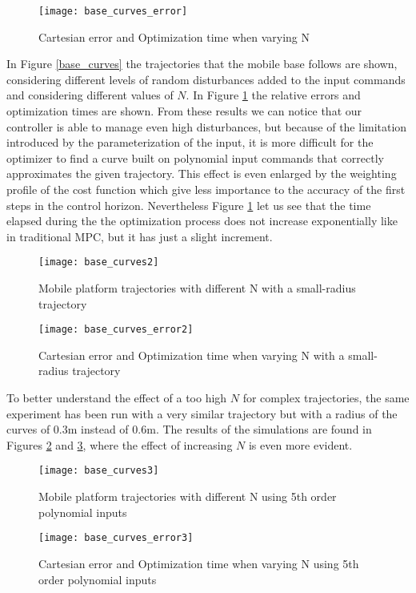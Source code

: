 \begin{figure}[!h]
	\texttt{[image: base\_curves\_error]}
	\centering
	\caption{Cartesian error and Optimization time when varying N}
	\label{base_curves_errors}
\end{figure}
In Figure \ref{base_curves} the trajectories that the mobile base follows are shown, considering different levels of random disturbances added to the input commands and considering different values of $N$. In Figure \ref{base_curves_errors} the relative errors and optimization times are shown. From these results we can notice that our controller is able to manage even high disturbances, but because of the limitation introduced by the parameterization of the input, it is more difficult for the optimizer to find a curve built on polynomial input commands that correctly approximates the given trajectory. This effect is even enlarged by the weighting profile of the cost function which give less importance to the accuracy of the first steps in the control horizon. Nevertheless Figure \ref{base_curves_errors} let us see that the time elapsed during the the optimization process does not increase exponentially like in traditional MPC, but it has just a slight increment.\\
\begin{figure}[p]
	\centering
	\texttt{[image: base\_curves2]}
	\caption{Mobile platform trajectories with different N with a small-radius trajectory}
	\label{base_curves2}
\end{figure}
\begin{figure}[p]
	\texttt{[image: base\_curves\_error2]}
	\centering
	\caption{Cartesian error and Optimization time when varying N with a small-radius trajectory}
	\label{base_curves_errors2}
\end{figure}
To better understand the effect of a too high $N$ for complex trajectories, the same experiment has been run with a very similar trajectory but with a radius of the curves of $0.3$m instead of $0.6$m. The results of the simulations are found in Figures \ref{base_curves2} and \ref{base_curves_errors2}, where the effect of increasing $N$ is even more evident.
\begin{figure}[p]
	\centering
	\texttt{[image: base\_curves3]}
	\caption{Mobile platform trajectories with different N using 5th order polynomial inputs}
	\label{base_curves3}
\end{figure}
\begin{figure}[p]
	\texttt{[image: base\_curves\_error3]}
	\centering
	\caption{Cartesian error and Optimization time when varying N using 5th order polynomial inputs}
	\label{base_curves_errors3}
\end{figure}
